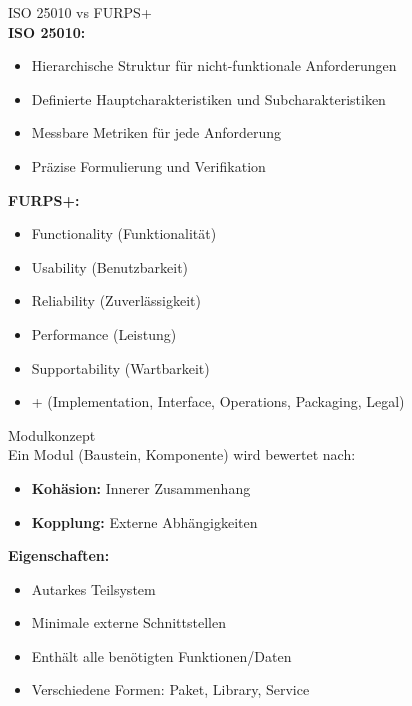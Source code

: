 \begin{theorem}{ISO 25010 vs FURPS+}\\
\textbf{ISO 25010:}
\begin{itemize}
    \item Hierarchische Struktur für nicht-funktionale Anforderungen
    \item Definierte Hauptcharakteristiken und Subcharakteristiken
    \item Messbare Metriken für jede Anforderung
    \item Präzise Formulierung und Verifikation
\end{itemize}

\textbf{FURPS+:}
\begin{itemize}
    \item Functionality (Funktionalität)
    \item Usability (Benutzbarkeit)
    \item Reliability (Zuverlässigkeit)
    \item Performance (Leistung)
    \item Supportability (Wartbarkeit)
    \item + (Implementation, Interface, Operations, Packaging, Legal)
\end{itemize}
\end{theorem}

\begin{concept}{Modulkonzept}\\
Ein Modul (Baustein, Komponente) wird bewertet nach:
\begin{itemize}
    \item \textbf{Kohäsion:} Innerer Zusammenhang
    \item \textbf{Kopplung:} Externe Abhängigkeiten
\end{itemize}

\textbf{Eigenschaften:}
\begin{itemize}
    \item Autarkes Teilsystem
    \item Minimale externe Schnittstellen
    \item Enthält alle benötigten Funktionen/Daten
    \item Verschiedene Formen: Paket, Library, Service
\end{itemize}
\end{concept}


